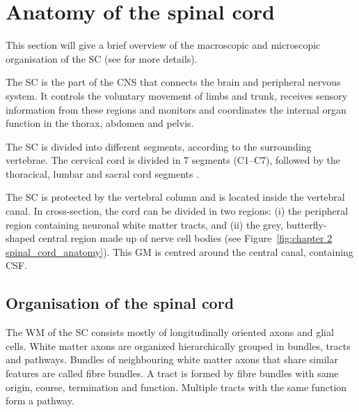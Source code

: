 \newcommand{\prot}{\ensuremath{\mathcal{P}}}
\label{chapter2}
\section{Anatomy of the spinal cord}
\glsresetall
This section will give a brief overview of the macroscopic and microscopic organisation of the \gls{SC} (see \citep{Carpenter:1991,Heimer:1995,Watson:2009} for more details).


The {\gls{SC}} is the part of the {\gls{CNS}} that connects the brain and peripheral nervous system. It controls the voluntary movement of limbs and trunk, receives sensory information from these regions and monitors and coordinates the internal organ function in the thorax, abdomen and pelvis. 


The \gls{SC} is divided into different segments, according to the surrounding vertebrae. The cervical cord is divided in 7 segments (C1--C7), followed by the thoracical, lumbar and sacral cord segments \citep{Heimer:1995,Watson:2009}.


The {\gls{SC}} is protected by the vertebral column and is located inside the vertebral canal. In cross-section, the cord can be divided in two regions: (i) the peripheral region containing neuronal white matter tracts, and (ii) the grey, butterfly-shaped central region made up of nerve cell bodies (see Figure~\ref{fig:chapter 2 spinal_cord_anatomy}). This \gls{GM} is centred around the central canal, containing \gls{CSF}.

\subsection{Organisation of the spinal cord}
The \gls{WM} of the {\gls{SC}} consists mostly of longitudinally oriented axons and glial cells. White matter axons are organized hierarchically grouped in bundles, tracts and pathways. Bundles of neighbouring white matter axons that share similar features are called fibre bundles. A tract is formed by fibre bundles with same origin, course, termination and function. Multiple tracts with the same function form a pathway.

